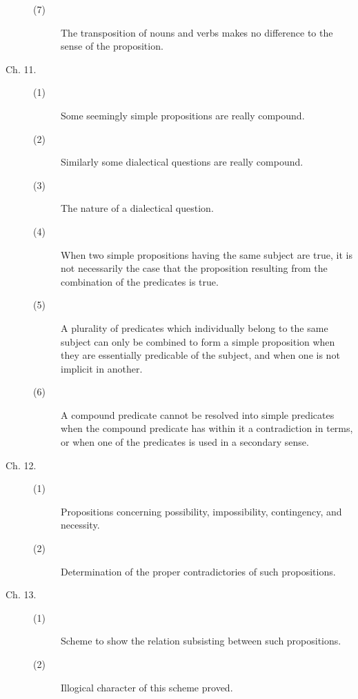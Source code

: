 \begin{description}
\begin{description}
\item[(7)] The transposition of nouns and verbs makes no difference to the sense of the proposition. 

\end{description}

\item[Ch. 11.]

\begin{description}
 \item[(1)] Some seemingly simple propositions are really compound. 

\item[(2)] Similarly some dialectical questions are really compound. 

\item[(3)] The nature of a dialectical question. 

\item[(4)] When two simple propositions having the same subject are true, 
it is not necessarily the case that the proposition resulting from 
the combination of the predicates is true.

\item[(5)] A plurality of predicates which individually belong to the same 
subject can only be combined to form a simple proposition when 
they are essentially predicable of the subject, and when one is 
not implicit in another. 

\item[(6)] A compound predicate cannot be resolved into simple predicates 
when the compound predicate has within it a contradiction in 
terms, or when one of the predicates is used in a secondary sense. 
\end{description}

\item[Ch. 12.]
\begin{description}
 \item[(1)] Propositions concerning possibility, impossibility, contingency, and necessity. 
\item[(2)] Determination of the proper contradictories of such propositions. 
\end{description}

\item[Ch. 13.]
\begin{description}
 \item[(1)] Scheme to show the relation subsisting between such propositions. 

\item[(2)] Illogical character of this scheme proved. 


\end{description}
\end{description}
